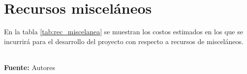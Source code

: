 \section{Recursos misceláneos}
En la tabla \ref{tab:rec_miscelanea} se muestran los costos estimados en los que se incurrirá para el desarrollo del proyecto con respecto a recursos de misceláneos.
  \begin{table}[!htb]
    \caption{Recursos misceláneos}
    \label{tab:rec_miscelanea}
    \begin{center}
     \\
    \textbf{Fuente:} Autores
    \end{center}
  \end{table}

